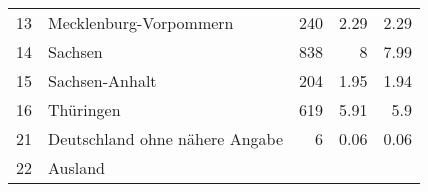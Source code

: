 \begin{longtable}{lXrrr}
     13 &
     \multicolumn{1}{X}{ Mecklenburg-Vorpommern   } &


       \num{240} &
       \num[round-mode=places,round-precision=2]{2.29} &
         \num[round-mode=places,round-precision=2]{2.29} \\

     14 &
     \multicolumn{1}{X}{ Sachsen   } &


       \num{838} &
       \num[round-mode=places,round-precision=2]{8} &
         \num[round-mode=places,round-precision=2]{7.99} \\

     15 &
     \multicolumn{1}{X}{ Sachsen-Anhalt   } &


       \num{204} &
       \num[round-mode=places,round-precision=2]{1.95} &
         \num[round-mode=places,round-precision=2]{1.94} \\

     16 &
     \multicolumn{1}{X}{ Thüringen   } &


       \num{619} &
       \num[round-mode=places,round-precision=2]{5.91} &
         \num[round-mode=places,round-precision=2]{5.9} \\

     21 &
     \multicolumn{1}{X}{ Deutschland ohne nähere Angabe   } &


       \num{6} &
       \num[round-mode=places,round-precision=2]{0.06} &
         \num[round-mode=places,round-precision=2]{0.06} \\

     22 &
     \multicolumn{1}{X}{ Ausland   } &



\end{longtable}

